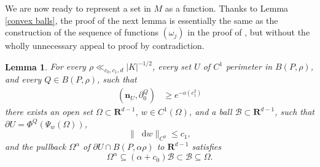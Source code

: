 \documentclass[final,12pt, leqno]{brownthesis}
\newcommand{\RR}{\mathbf{R}}
\newcommand*\dif{\mathop{}\!\mathrm{d}}
\newcommand{\normal}{\mathbf n}
\newtheorem{lemma}[theorem]{Lemma}
\theoremstyle{definition}
\numberwithin{equation}{section}
\begin{document}
We are now ready to represent a set in $M$ as a function.
Thanks to Lemma \ref{convex balls}, the proof of the next lemma is essentially the same as the construction of the sequence of functions $(\omega_j)$ in the proof of \cite[Lemma 6.4]{Giusti77}, but without the wholly unnecessary appeal to proof by contradiction.

\begin{lemma}\label{rep as a good graph}
For every $\rho \ll_{c_0, c_1, d} |K|^{-1/2}$, every set $U$ of $C^1$ perimeter in $B(P, \rho)$, and every $Q \in B(P, \rho)$, such that
\begin{align}
(\normal_U, \partial_0^Q) &\geq e^{-o(c_1^2)} \label{rep as a good graph hyp}
\end{align}
there exists an open set $\Omega \subset \RR^{d - 1}$, $w \in C^1(\Omega)$, and a ball $\mathscr B \subset \RR^{d - 1}$, such that $\partial U = \Phi^Q(\Psi_w(\Omega))$,
\begin{equation}\label{rep as a good graph small derivative}
\|\dif w\|_{C^0} \leq c_1,
\end{equation}
and the pullback $\Omega^\alpha$ of $\partial U \cap B(P, \alpha \rho)$ to $\RR^{d - 1}$ satisfies
\begin{equation}\label{rep as a good graph set nests}
    \Omega^\alpha \subseteq (\alpha + c_0) \mathscr B \subset \mathscr B \subseteq \Omega.
\end{equation}
\end{lemma}
\end{document}
